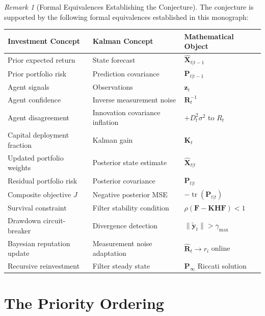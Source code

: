 \documentclass[12pt,openany]{book}
\numberwithin{equation}{chapter}
\theoremstyle{plain}
\theoremstyle{definition}
\theoremstyle{remark}
\newtheorem{remark}[theorem]{Remark}
\DeclareMathOperator{\tr}{tr}
\begin{document}
\begin{remark}[Formal Equivalences Establishing the Conjecture]
\label{rem:conjecture-equivalences}
The conjecture is supported by the following formal equivalences
established in this monograph:

\begin{center}
\begin{tabularx}{\textwidth}{@{} p{5.2cm} X p{4.0cm} @{}}
\toprule
\textbf{Investment Concept} & \textbf{Kalman Concept}
  & \textbf{Mathematical Object} \\
\midrule
Prior expected return & State forecast & $\hat{\mathbf{X}}_{t|t-1}$ \\
Prior portfolio risk & Prediction covariance & $\mathbf{P}_{t|t-1}$ \\
Agent signals & Observations & $\mathbf{z}_t$ \\
Agent confidence & Inverse measurement noise & $\mathbf{R}_t^{-1}$ \\
Agent disagreement & Innovation covariance inflation
  & $+D_t^2\sigma^2$ to $R_t$ \\
Capital deployment fraction & Kalman gain & $\mathbf{K}_t$ \\
Updated portfolio weights & Posterior state estimate
  & $\hat{\mathbf{X}}_{t|t}$ \\
Residual portfolio risk & Posterior covariance & $\mathbf{P}_{t|t}$ \\
Composite objective $J$ & Negative posterior MSE
  & $-\tr(\mathbf{P}_{t|t})$ \\
Survival constraint & Filter stability condition
  & $\rho(\mathbf{F} - \mathbf{K}\mathbf{H}\mathbf{F}) < 1$ \\
Drawdown circuit-breaker & Divergence detection
  & $\|\tilde{\mathbf{y}}_t\| > \gamma_{\max}$ \\
Bayesian reputation update & Measurement noise adaptation
  & $\hat{\mathbf{R}}_t \to r_i$ online \\
Recursive reinvestment & Filter steady state
  & $\mathbf{P}_\infty$ Riccati solution \\
\bottomrule
\end{tabularx}
\end{center}
\end{remark}

\section{The Priority Ordering}
\end{document}

